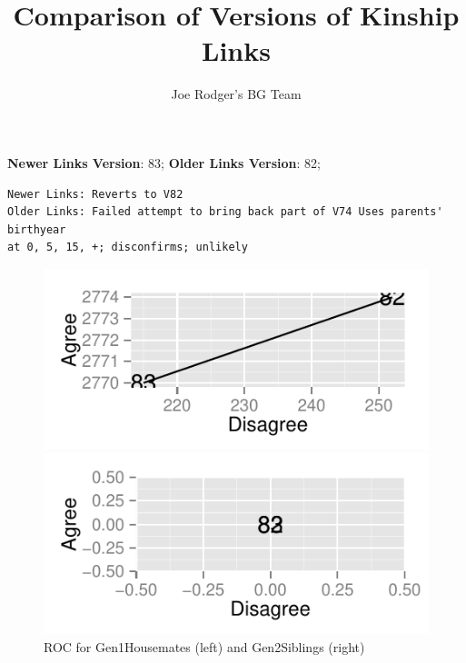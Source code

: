 \documentclass[a4paper]{article}\usepackage[]{graphicx}\usepackage[]{color}
\title{Comparison of Versions of Kinship Links}
\author{Joe Rodger's BG Team}
\makeatletter
\def\maxwidth{ %
  \ifdim\Gin@nat@width>\linewidth
    \linewidth
  \else
    \Gin@nat@width
  \fi
}
\newenvironment{kframe}{%
 \def\at@end@of@kframe{}%
 \ifinner\ifhmode%
  \def\at@end@of@kframe{\end{minipage}}%
  \begin{minipage}{\columnwidth}%
 \fi\fi%
 \def\FrameCommand##1{\hskip\@totalleftmargin \hskip-\fboxsep
 \colorbox{shadecolor}{##1}\hskip-\fboxsep
     \hskip-\linewidth \hskip-\@totalleftmargin \hskip\columnwidth}%
 \MakeFramed {\advance\hsize-\width
   \@totalleftmargin\z@ \linewidth\hsize
   \@setminipage}}%
 {\par\unskip\endMakeFramed%
 \at@end@of@kframe}
\newenvironment{knitrout}{}{} %
\makeatother
\begin{document}
\maketitle

\setlength{\parindent}{0pt}%







\textbf{Newer Links Version}: 83;
\textbf{Older Links Version}: 82;

\begin{knitrout}
\color{fgcolor}\begin{kframe}
\begin{verbatim}
Newer Links: Reverts to V82
Older Links: Failed attempt to bring back part of V74 Uses parents' birthyear
at 0, 5, 15, +; disconfirms; unlikely
\end{verbatim}
\end{kframe}
\end{knitrout}


\begin{figure}[htbp]
\begin{knitrout}
\color{fgcolor}
\includegraphics[width=\maxwidth]{figure/unnamed-chunk-31} 

\includegraphics[width=\maxwidth]{figure/unnamed-chunk-32} 

\end{knitrout}

\caption{ROC for Gen1Housemates (left) and Gen2Siblings (right)}
\end{figure}
\end{document}
